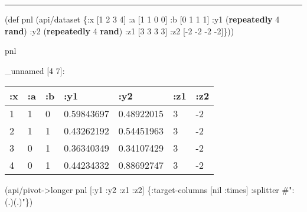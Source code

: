 \documentclass[]{article}
\newenvironment{Shaded}{\begin{snugshade}}{\end{snugshade}}
\newcommand{\AttributeTok}[1]{\textcolor[rgb]{0.77,0.63,0.00}{#1}}
\newcommand{\BuiltInTok}[1]{#1}
\newcommand{\DecValTok}[1]{\textcolor[rgb]{0.00,0.00,0.81}{#1}}
\newcommand{\FunctionTok}[1]{\textcolor[rgb]{0.00,0.00,0.00}{#1}}
\newcommand{\KeywordTok}[1]{\textcolor[rgb]{0.13,0.29,0.53}{\textbf{#1}}}
\newcommand{\NormalTok}[1]{#1}
\newcommand{\SpecialStringTok}[1]{\textcolor[rgb]{0.31,0.60,0.02}{#1}}
\newcommand{\VariableTok}[1]{\textcolor[rgb]{0.00,0.00,0.00}{#1}}
\begin{document}
\begin{center}\rule{0.5\linewidth}{0.5pt}\end{center}

\begin{Shaded}
\begin{Highlighting}[]
\NormalTok{(}\BuiltInTok{def}\FunctionTok{ pnl }\NormalTok{(api/dataset \{}\AttributeTok{:x}\NormalTok{ [}\DecValTok{1} \DecValTok{2} \DecValTok{3} \DecValTok{4}\NormalTok{]}
                       \AttributeTok{:a}\NormalTok{ [}\DecValTok{1} \DecValTok{1} \DecValTok{0} \DecValTok{0}\NormalTok{]}
                       \AttributeTok{:b}\NormalTok{ [}\DecValTok{0} \DecValTok{1} \DecValTok{1} \DecValTok{1}\NormalTok{]}
                       \AttributeTok{:y1}\NormalTok{ (}\KeywordTok{repeatedly} \DecValTok{4} \KeywordTok{rand}\NormalTok{)}
                       \AttributeTok{:y2}\NormalTok{ (}\KeywordTok{repeatedly} \DecValTok{4} \KeywordTok{rand}\NormalTok{)}
                       \AttributeTok{:z1}\NormalTok{ [}\DecValTok{3} \DecValTok{3} \DecValTok{3} \DecValTok{3}\NormalTok{]}
                       \AttributeTok{:z2}\NormalTok{ [-}\DecValTok{2} \DecValTok{-2} \DecValTok{-2} \DecValTok{-2}\NormalTok{]\}))}
\end{Highlighting}
\end{Shaded}

\begin{Shaded}
\begin{Highlighting}[]
\NormalTok{pnl}
\end{Highlighting}
\end{Shaded}

\_unnamed {[}4 7{]}:

\begin{longtable}[]{@{}lllllll@{}}
\toprule
:x & :a & :b & :y1 & :y2 & :z1 & :z2\tabularnewline
\midrule
\endhead
1 & 1 & 0 & 0.59843697 & 0.48922015 & 3 & -2\tabularnewline
2 & 1 & 1 & 0.43262192 & 0.54451963 & 3 & -2\tabularnewline
3 & 0 & 1 & 0.36340349 & 0.34107429 & 3 & -2\tabularnewline
4 & 0 & 1 & 0.44234332 & 0.88692747 & 3 & -2\tabularnewline
\bottomrule
\end{longtable}

\begin{Shaded}
\begin{Highlighting}[]
\NormalTok{(api/pivot->longer pnl [}\AttributeTok{:y1} \AttributeTok{:y2} \AttributeTok{:z1} \AttributeTok{:z2}\NormalTok{] \{}\AttributeTok{:target-columns}\NormalTok{ [}\VariableTok{nil} \AttributeTok{:times}\NormalTok{]}
                                          \AttributeTok{:splitter} \SpecialStringTok{#":(.)(.)"}\NormalTok{\})}
\end{Highlighting}
\end{Shaded}
\end{document}
